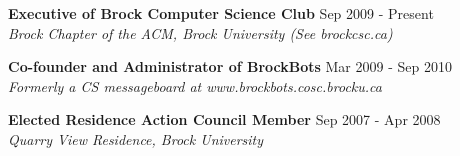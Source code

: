 \documentclass[margin]{res}
\begin{document}
\begin{resume}
  \textbf{Executive of Brock Computer Science Club} \hfill Sep 2009 - Present \\
    {\sl Brock Chapter of the ACM, Brock University (See brockcsc.ca)}


  \textbf{Co-founder and Administrator of BrockBots} \hfill Mar 2009 - Sep 2010 \\
    {\sl Formerly a CS messageboard at www.brockbots.cosc.brocku.ca}
    

  \textbf{Elected Residence Action Council Member} \hfill Sep 2007 - Apr 2008 \\
    {\sl Quarry View Residence, Brock University}
 

\end{resume}
\end{document}
